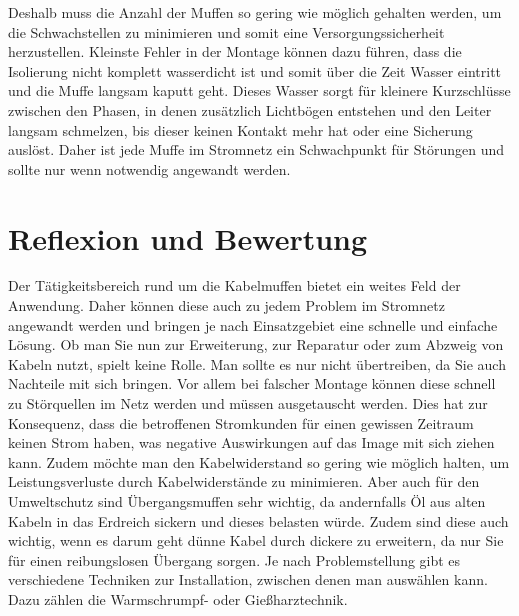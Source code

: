 Deshalb muss die Anzahl der Muffen so gering wie möglich gehalten werden, um die Schwachstellen zu minimieren und somit eine Versorgungssicherheit
herzustellen. Kleinste Fehler in der Montage können dazu führen, dass die Isolierung nicht komplett wasserdicht ist und somit über die Zeit Wasser 
eintritt und die Muffe langsam kaputt geht. Dieses Wasser sorgt für kleinere Kurzschlüsse zwischen den Phasen, in denen zusätzlich Lichtbögen entstehen 
und den Leiter langsam schmelzen, bis dieser keinen Kontakt mehr hat oder eine Sicherung auslöst. Daher ist jede Muffe im Stromnetz ein Schwachpunkt für 
Störungen und sollte nur wenn notwendig angewandt werden.


\section{Reflexion und Bewertung}

Der Tätigkeitsbereich rund um die Kabelmuffen bietet ein weites Feld der Anwendung. Daher können diese auch zu jedem Problem im Stromnetz angewandt werden 
und bringen je nach Einsatzgebiet eine schnelle und einfache Lösung. Ob man Sie nun zur Erweiterung, zur Reparatur oder zum Abzweig von Kabeln nutzt, spielt 
keine Rolle. Man sollte es nur nicht übertreiben, da Sie auch Nachteile mit sich bringen. Vor allem bei falscher Montage können diese schnell zu Störquellen
im Netz werden und müssen ausgetauscht werden. Dies hat zur Konsequenz, dass die betroffenen Stromkunden für einen gewissen Zeitraum keinen Strom haben, 
was negative Auswirkungen auf das Image mit sich ziehen kann. Zudem möchte man den Kabelwiderstand so gering wie möglich halten, um Leistungsverluste 
durch Kabelwiderstände zu minimieren. Aber auch für den Umweltschutz sind \zB Übergangsmuffen sehr wichtig, da andernfalls Öl aus alten Kabeln in das 
Erdreich sickern und dieses belasten würde. Zudem sind diese auch wichtig, wenn es darum geht dünne Kabel durch dickere zu erweitern, da nur Sie für einen 
reibungslosen Übergang sorgen. Je nach Problemstellung gibt es verschiedene Techniken zur Installation, zwischen denen man auswählen kann. Dazu zählen die 
Warmschrumpf- oder Gießharztechnik.

\clearpage

